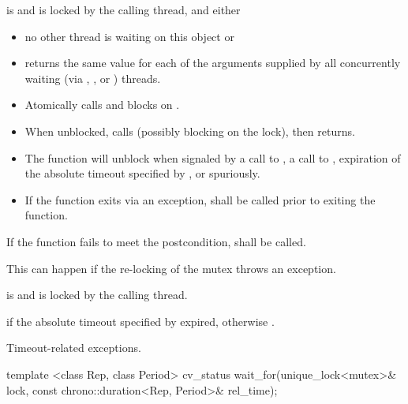 \begin{itemdescr}
\pnum
\requires {} is  and 
is locked by the calling thread, and either
\begin{itemize}
\item no other thread is waiting on this  object or
\item {} returns the same value for each of the 
arguments supplied by all concurrently waiting (via ,
, or ) threads.
\end{itemize}

\pnum
\effects
\begin{itemize}
\item
Atomically calls  and blocks on .

\item
When unblocked, calls  (possibly blocking on the lock), then returns.

\item
The function will unblock when signaled by a call to , a call to ,
expiration of the absolute timeout specified by ,
or spuriously.

\item
If the function exits via an exception,  shall be called prior to exiting the function.
\end{itemize}

\pnum
\remarks
If the function fails to meet the postcondition, 
shall be called.
\begin{note} This can happen if the re-locking of the mutex throws an exception. \end{note}

\pnum
\postconditions {} is  and 
is locked by the calling thread.

\pnum
\returns {} if
the absolute timeout specified by  expired,
otherwise .

\pnum\throws Timeout-related
exceptions.

\end{itemdescr}

%
\begin{itemdecl}
template <class Rep, class Period>
  cv_status wait_for(unique_lock<mutex>& lock,
                     const chrono::duration<Rep, Period>& rel_time);
\end{itemdecl}

